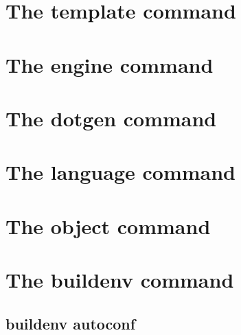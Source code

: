 %
%
%
%
%
\section{The template command}


\section{The engine command}


\section{The dotgen command}


\section{The language command}


\section{The object command}


\section{The buildenv command}
\subsection{buildenv autoconf}

